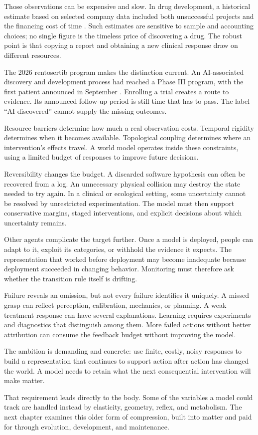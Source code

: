 Those observations can be expensive and slow. In drug development, a historical estimate based on selected company data included both unsuccessful projects and the financing cost of time \cite{dimasi2016}. Such estimates are sensitive to sample and accounting choices; no single figure is the timeless price of discovering a drug. The robust point is that copying a report and obtaining a new clinical response draw on different resources.

The 2026 rentosertib program makes the distinction current. An AI-associated discovery and development process had reached a Phase III program, with the first patient announced in September \cite{insilico2026phase3}. Enrolling a trial creates a route to evidence. Its announced follow-up period is still time that has to pass. The label “AI-discovered” cannot supply the missing outcomes.

Resource barriers determine how much a real observation costs. Temporal rigidity determines when it becomes available. Topological coupling determines where an intervention's effects travel. A world model operates inside these constraints, using a limited budget of responses to improve future decisions.

Reversibility changes the budget. A discarded software hypothesis can often be recovered from a log. An unnecessary physical collision may destroy the state needed to try again. In a clinical or ecological setting, some uncertainty cannot be resolved by unrestricted experimentation. The model must then support conservative margins, staged interventions, and explicit decisions about which uncertainty remains.

Other agents complicate the target further. Once a model is deployed, people can adapt to it, exploit its categories, or withhold the evidence it expects. The representation that worked before deployment may become inadequate because deployment succeeded in changing behavior. Monitoring must therefore ask whether the transition rule itself is drifting.

Failure reveals an omission, but not every failure identifies it uniquely. A missed grasp can reflect perception, calibration, mechanics, or planning. A weak treatment response can have several explanations. Learning requires experiments and diagnostics that distinguish among them. More failed actions without better attribution can consume the feedback budget without improving the model.

The ambition is demanding and concrete: use finite, costly, noisy responses to build a representation that continues to support action after action has changed the world. A model needs to retain what the next consequential intervention will make matter.

That requirement leads directly to the body. Some of the variables a model could track are handled instead by elasticity, geometry, reflex, and metabolism. The next chapter examines this older form of compression, built into matter and paid for through evolution, development, and maintenance.
